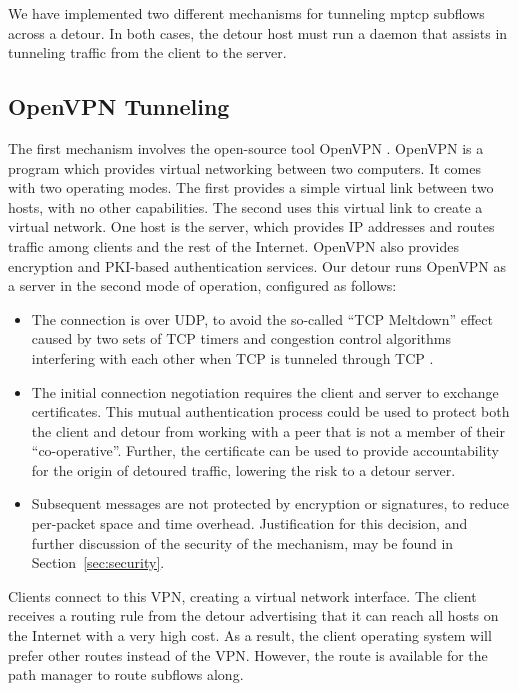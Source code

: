 \documentclass{cwru}
\begin{document}
We have implemented two different mechanisms for tunneling \ac{mptcp} subflows across
a detour. In both cases, the detour host must run a daemon that assists in
tunneling traffic from the client to the server.

\subsection{OpenVPN Tunneling}

The first mechanism involves the open-source tool OpenVPN
\cite{yonan2007openvpn}. OpenVPN is a program which provides virtual networking
between two computers. It comes with two operating modes. The first provides a
simple virtual link between two hosts, with no other capabilities. The second
uses this virtual link to create a virtual network. One host is the server,
which provides IP addresses and routes traffic among clients and the rest of the
Internet. OpenVPN also provides encryption and PKI-based authentication
services. Our detour runs OpenVPN as a server in the second mode of operation,
configured as follows:

\begin{itemize}
\item The connection is over UDP, to avoid the so-called ``TCP Meltdown'' effect
  caused by two sets of TCP timers and congestion control algorithms interfering
  with each other when TCP is tunneled through TCP \cite{khanvilkar2004virtual}.
\item The initial connection negotiation requires the client and server to
  exchange certificates. This mutual authentication process could be used to
  protect both the client and detour from working with a peer that is not a
  member of their ``co-operative''. Further, the certificate can be used to
  provide accountability for the origin of detoured traffic, lowering the risk
  to a detour server.
\item Subsequent messages are not protected by encryption or signatures, to
  reduce per-packet space and time overhead. Justification for this decision,
  and further discussion of the security of the mechanism, may be found in
  Section~\ref{sec:security}.
\end{itemize}

Clients connect to this VPN, creating a virtual network interface. The
client receives a routing rule from the detour advertising that it can reach all
hosts on the Internet with a very high cost. As a result, the client operating
system will prefer other routes instead of the VPN. However, the route is
available for the path manager to route subflows along.
\end{document}
